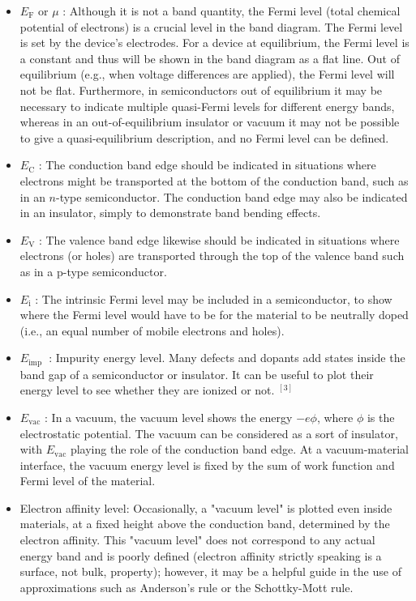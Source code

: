 \documentclass[main.tex]{subfiles}
\begin{document}
\begin{enumerate}
\begin{enumerate}
        \begin{itemize}
            \item $E_{\mathrm{F}}$ or $\mu$ : Although it is not a band quantity, the Fermi level (total chemical potential of electrons) is a crucial level in the band diagram. The Fermi level is set by the device's electrodes. For a device at equilibrium, the Fermi level is a constant and thus will be shown in the band diagram as a flat line. Out of equilibrium (e.g., when voltage differences are applied), the Fermi level will not be flat. Furthermore, in semiconductors out of equilibrium it may be necessary to indicate multiple quasi-Fermi levels for different energy bands, whereas in an out-of-equilibrium insulator or vacuum it may not be possible to give a quasi-equilibrium description, and no Fermi level can be defined.
            \item $E_{\mathrm{C}}$ : The conduction band edge should be indicated in situations where electrons might be transported at the bottom of the conduction band, such as in an $n$-type semiconductor. The conduction band edge may also be indicated in an insulator, simply to demonstrate band bending effects.
            \item $E_{\mathrm{V}}$ : The valence band edge likewise should be indicated in situations where electrons (or holes) are transported through the top of the valence band such as in a p-type semiconductor.
            \item $E_{\mathrm{i}}$ : The intrinsic Fermi level may be included in a semiconductor, to show where the Fermi level would have to be for the material to be neutrally doped (i.e., an equal number of mobile electrons and holes).
            \item $E_{\text {imp }}$ : Impurity energy level. Many defects and dopants add states inside the band gap of a semiconductor or insulator. It can be useful to plot their energy level to see whether they are ionized or not. ${ }^{[3]}$
            \item $E_{\mathrm{vac}}$ : In a vacuum, the vacuum level shows the energy $-e \phi$, where $\phi$ is the electrostatic potential. The vacuum can be considered as a sort of insulator, with $E_{\mathrm{vac}}$ playing the role of the conduction band edge. At a vacuum-material interface, the vacuum energy level is fixed by the sum of work function and Fermi level of the material.
            \item Electron affinity level: Occasionally, a "vacuum level" is plotted even inside materials, at a fixed height above the conduction band, determined by the electron affinity. This "vacuum level" does not correspond to any actual energy band and is poorly defined (electron affinity strictly speaking is a surface, not bulk, property); however, it may be a helpful guide in the use of approximations such as Anderson's rule or the Schottky-Mott rule.
        \end{itemize}


\end{enumerate}
\end{enumerate}
\end{document}
